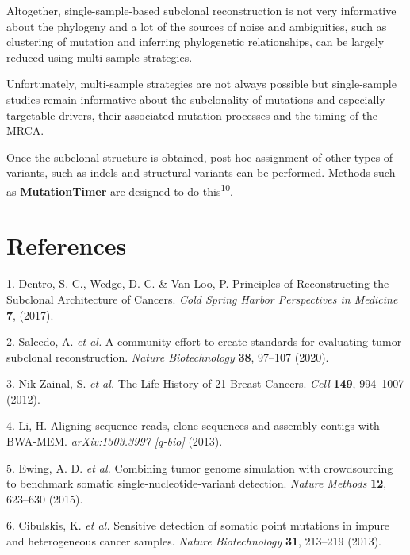 \documentclass[]{article}
\begin{document}
Altogether, single-sample-based subclonal reconstruction is not very
informative about the phylogeny and a lot of the sources of noise and
ambiguities, such as clustering of mutation and inferring phylogenetic
relationships, can be largely reduced using multi-sample strategies.

Unfortunately, multi-sample strategies are not always possible but
single-sample studies remain informative about the subclonality of
mutations and especially targetable drivers, their associated mutation
processes and the timing of the MRCA.

Once the subclonal structure is obtained, post hoc assignment of other
types of variants, such as indels and structural variants can be
performed. Methods such as
\href{https://github.com/gerstung-lab/MutationTimeR}{\textbf{MutationTimer}}
are designed to do this\textsuperscript{10}.

\newpage

\hypertarget{references}{%
\section*{References}\label{references}}

\hypertarget{refs}{}
\leavevmode\hypertarget{ref-dentro_principles_2017}{}%
1. Dentro, S. C., Wedge, D. C. \& Van Loo, P. Principles of
Reconstructing the Subclonal Architecture of Cancers. \emph{Cold Spring
Harbor Perspectives in Medicine} \textbf{7}, (2017).

\leavevmode\hypertarget{ref-salcedo_community_2020}{}%
2. Salcedo, A. \emph{et al.} A community effort to create standards for
evaluating tumor subclonal reconstruction. \emph{Nature Biotechnology}
\textbf{38}, 97--107 (2020).

\leavevmode\hypertarget{ref-nik-zainal_life_2012}{}%
3. Nik-Zainal, S. \emph{et al.} The Life History of 21 Breast Cancers.
\emph{Cell} \textbf{149}, 994--1007 (2012).

\leavevmode\hypertarget{ref-li_aligning_2013}{}%
4. Li, H. Aligning sequence reads, clone sequences and assembly contigs
with BWA-MEM. \emph{arXiv:1303.3997 {[}q-bio{]}} (2013).

\leavevmode\hypertarget{ref-ewing_combining_2015}{}%
5. Ewing, A. D. \emph{et al.} Combining tumor genome simulation with
crowdsourcing to benchmark somatic single-nucleotide-variant detection.
\emph{Nature Methods} \textbf{12}, 623--630 (2015).

\leavevmode\hypertarget{ref-cibulskis_sensitive_2013}{}%
6. Cibulskis, K. \emph{et al.} Sensitive detection of somatic point
mutations in impure and heterogeneous cancer samples. \emph{Nature
Biotechnology} \textbf{31}, 213--219 (2013).
\end{document}
